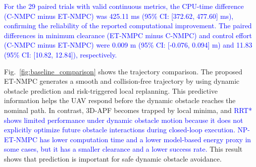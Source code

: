 \documentclass[lettersize,journal]{IEEEtran}
\begin{document}
\textcolor{blue}{For the 29 paired trials with valid continuous metrics, the CPU-time difference (C-NMPC minus ET-NMPC) was 425.11 ms (95\% CI: [372.62, 477.60] ms), confirming the reliability of the reported computational improvement. The paired differences in minimum clearance (ET-NMPC minus C-NMPC) and control effort (C-NMPC minus ET-NMPC) were 0.009 m (95\% CI: [-0.076, 0.094] m) and 11.83 (95\% CI: [10.82, 12.84]), respectively.}

Fig.~\ref{fig:baseline_comparison} shows the trajectory comparison. The proposed ET-NMPC generates a smooth and collision-free trajectory by using dynamic obstacle prediction and risk-triggered local replanning. This predictive information helps the UAV respond before the dynamic obstacle reaches the nominal path. In contrast, 3D-APF becomes trapped by local minima, and \textcolor{blue}{RRT* shows limited performance under dynamic obstacle motion because it does not explicitly optimize future obstacle interactions during closed-loop execution.} \textcolor{blue}{NP-ET-NMPC has lower computation time and a lower model-based energy proxy in some cases, but it has a smaller clearance and a lower success rate.} This result shows that prediction is important for safe dynamic obstacle avoidance.
\end{document}

